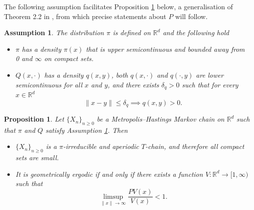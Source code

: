 \documentclass{article}
\theoremstyle{definition}
\theoremstyle{plain}
\newtheorem{assumption}{Assumption}[section]
\newtheorem{proposition}[definition]{Proposition}
\newtheorem{lemma}[definition]{Lemma}
\begin{document}
The following assumption facilitates Proposition \ref{prop: MH is a T-chain} below, a generalisation of Theorem 2.2 in \cite{roberts1996geometric}, from which precise statements about $P$ will follow.


\begin{assumption}
    The distribution $\pi$ is defined on $\mathbb{R}^d$ and the following hold
    \begin{itemize}
        \item[(i)] $\pi$ has a density $\pi(x)$ that is upper semicontinuous and bounded away from 0 and $\infty$ on compact sets.
        \item[(ii)] $Q(x,\cdot)$ has a density $q(x,y)$, both $q(x,\cdot)$ and $q(\cdot,y)$ are lower semicontinuous for all $x$ and $y$, and there exists $\delta_q > 0$ such that for every $x \in \mathbb{R}^d$ \[
    \|x-y\| \leq \delta_q \implies q(x,y) > 0.
    \]
    \end{itemize}
    \label{ass:pi_q_regularities}
\end{assumption}

\begin{proposition}
\label{prop: MH is a T-chain}
    Let $\{X_n\}_{n\geq 0}$ be a Metropolis--Hastings Markov chain on $\mathbb{R}^d$ such that $\pi$ and $Q$ satisfy Assumption \ref{ass:pi_q_regularities}.  Then
    \begin{itemize}
        \item [(i)] $\{X_n\}_{n\geq 0}$ is a $\pi$-irreducible and aperiodic $T$-chain, and therefore all compact sets are small.
        \item [(ii)]  It is geometrically ergodic if and only if there exists a function $V: \mathbb{R}^d\to[1,\infty)$ such that 
        $$
        \limsup_{\|x\|\to\infty} \frac{PV(x)}{V(x)}<1.
        $$
    \end{itemize}
\end{proposition}
\end{document}
